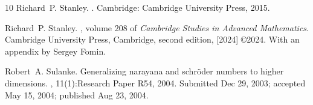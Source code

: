 \documentclass[12pt,notitlepage]{amsart}
\numberwithin{equation}{section}
\theoremstyle{thmstyleone}%
\theoremstyle{thmstyletwo}%
\theoremstyle{thmstylethree}%
\numberwithin{theorem}{section}
\numberwithin{equation}{section}
\begin{document}
\begin{thebibliography}{10}
Richard~P. Stanley.
.
\newblock Cambridge: Cambridge University Press, 2015.

Richard~P. Stanley.
, volume 208 of {\em Cambridge Studies in Advanced Mathematics}.
\newblock Cambridge University Press, Cambridge, second edition, [2024] \copyright 2024.
\newblock With an appendix by Sergey Fomin.

Robert~A. Sulanke.
\newblock Generalizing narayana and schröder numbers to higher dimensions.
, 11(1):Research Paper R54, 2004.
\newblock Submitted Dec 29, 2003; accepted May 15, 2004; published Aug 23, 2004.

\end{thebibliography}
\end{document}
